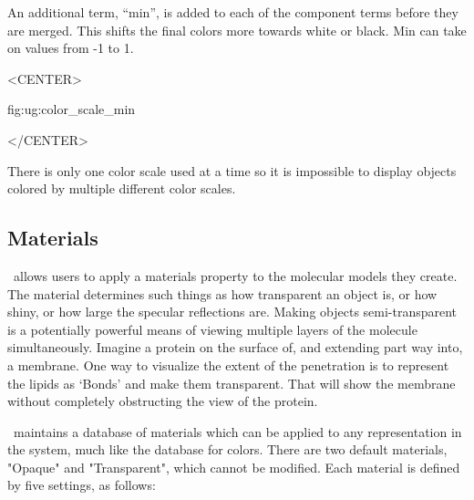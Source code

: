 An additional term, ``min'', is added to each of the component terms
before they are merged.  This shifts the final colors more towards
white or black.  Min can take on values from -1 to 1.

\begin{rawhtml}
<CENTER>
\end{rawhtml}
{fig:ug:color_scale_min}
\begin{rawhtml}
</CENTER>
\end{rawhtml}

There is only one color scale used at a time so it is impossible to
display objects colored by multiple different color scales.

\subsection{Materials}
\label{ug:topic:coloring:materials}

\VMD\ allows users to apply a materials property to the
molecular models they create.  The material determines such things
as how transparent an object is, or how shiny, or how large the specular 
reflections are.   
Making objects semi-transparent is a potentially powerful means of
viewing multiple layers of the molecule simultaneously.  Imagine a
protein on the surface of, and extending part way into, a membrane.
One way to visualize the extent of the penetration is to represent the
lipids as `Bonds' and make them transparent.  That will show the
membrane without completely obstructing the view of the protein.

\VMD\ maintains a database of materials which can be applied to any
representation in the system, much like the database for colors.  There
are two default materials, "Opaque" and "Transparent", which cannot be
modified.  Each material is defined by five settings, as follows: 


